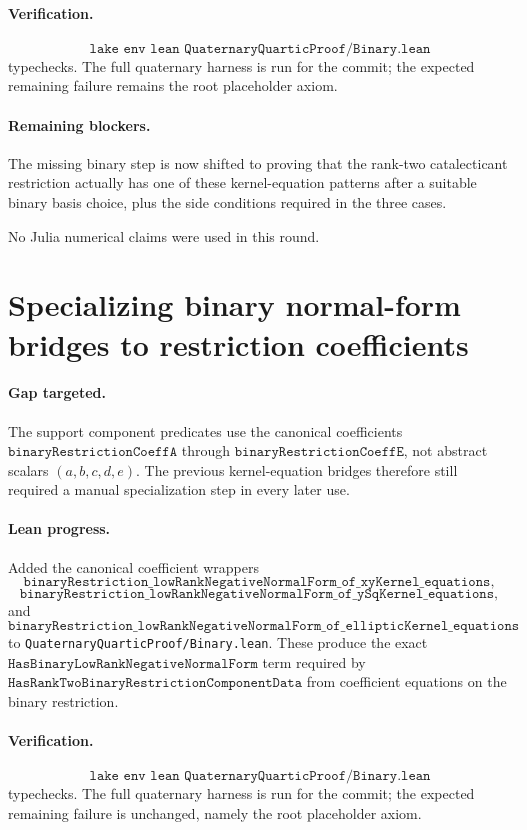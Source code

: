 \documentclass[11pt]{article}
\begin{document}
\paragraph{Verification.}
\[
\texttt{lake env lean QuaternaryQuarticProof/Binary.lean}
\]
typechecks.  The full quaternary harness is run for the commit; the expected
remaining failure remains the root placeholder axiom.

\paragraph{Remaining blockers.}
The missing binary step is now shifted to proving that the rank-two
catalecticant restriction actually has one of these kernel-equation patterns
after a suitable binary basis choice, plus the side conditions required in the
three cases.

No Julia numerical claims were used in this round.

\section*{Specializing binary normal-form bridges to restriction coefficients}

\paragraph{Gap targeted.}
The support component predicates use the canonical coefficients
\(\texttt{binaryRestrictionCoeffA}\) through
\(\texttt{binaryRestrictionCoeffE}\), not abstract scalars
\((a,b,c,d,e)\).  The previous kernel-equation bridges therefore still
required a manual specialization step in every later use.

\paragraph{Lean progress.}
Added the canonical coefficient wrappers
\[
\texttt{binaryRestriction\_lowRankNegativeNormalForm\_of\_xyKernel\_equations},
\]
\[
\texttt{binaryRestriction\_lowRankNegativeNormalForm\_of\_ySqKernel\_equations},
\]
and
\[
\texttt{binaryRestriction\_lowRankNegativeNormalForm\_of\_ellipticKernel\_equations}
\]
to \texttt{QuaternaryQuarticProof/Binary.lean}.  These produce the exact
\(\texttt{HasBinaryLowRankNegativeNormalForm}\) term required by
\(\texttt{HasRankTwoBinaryRestrictionComponentData}\) from coefficient
equations on the binary restriction.

\paragraph{Verification.}
\[
\texttt{lake env lean QuaternaryQuarticProof/Binary.lean}
\]
typechecks.  The full quaternary harness is run for the commit; the expected
remaining failure is unchanged, namely the root placeholder axiom.
\end{document}
